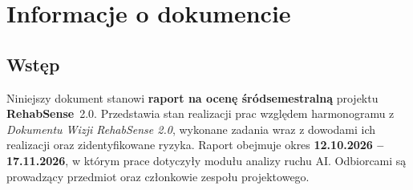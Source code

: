 \documentclass[11pt,a4paper]{article}
\newcommand{\sysname}{\textbf{RehabSense}}
\begin{document}
\newpage
\tableofcontents
\newpage

\section{Informacje o dokumencie}

\subsection{Wstęp}
Niniejszy dokument stanowi \textbf{raport na ocenę śródsemestralną} projektu \sysname{}~2.0. Przedstawia stan realizacji prac względem harmonogramu z \textit{Dokumentu Wizji RehabSense 2.0}, wykonane zadania wraz z dowodami ich realizacji oraz zidentyfikowane ryzyka. Raport obejmuje okres \textbf{12.10.2026 -- 17.11.2026}, w którym prace dotyczyły modułu analizy ruchu AI. Odbiorcami są prowadzący przedmiot oraz członkowie zespołu projektowego.
\end{document}
